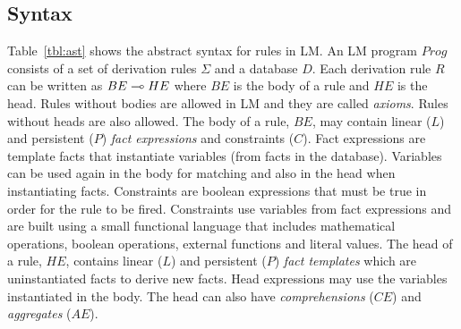 
\subsection{Syntax}

Table~\ref{tbl:ast} shows the abstract syntax for rules in LM.  An LM
program $Prog$ consists of a set of derivation rules $\Sigma$ and a
database $D$.  Each derivation rule $R$ can be written as $BE \multimap
HE$ where $BE$ is the body of a rule and $HE$ is the head. Rules
without bodies are allowed in LM and they are called
\textit{axioms}. Rules without heads are also allowed.  The body of a
rule, $BE$, may contain linear ($L$) and persistent ($P$) \emph{fact
  expressions} and constraints ($C$). Fact expressions are template
facts that instantiate variables (from facts in the
database). Variables can be used again in the body for matching and
also in the head when instantiating facts. Constraints are boolean
expressions that must be true in order for the rule to be
fired. Constraints use variables from fact expressions and are built
using a small functional language that includes mathematical
operations, boolean operations, external functions and literal values.
The head of a rule, $HE$, contains linear ($L$) and persistent ($P$)
\emph{fact templates} which are uninstantiated facts to derive new
facts. Head expressions may use the variables instantiated in the
body. The head can also have \emph{comprehensions} ($CE$) and
\emph{aggregates} ($AE$).

